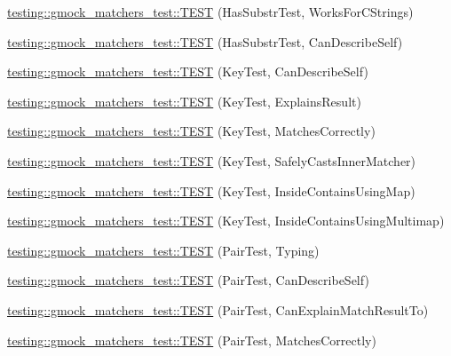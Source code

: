 \begin{DoxyCompactItemize}
\item 
\hyperlink{namespacetesting_1_1gmock__matchers__test_a147dde340ba8f77308cd116d3bb831d6}{testing\+::gmock\+\_\+matchers\+\_\+test\+::\+T\+E\+ST} (Has\+Substr\+Test, Works\+For\+C\+Strings)
\item 
\hyperlink{namespacetesting_1_1gmock__matchers__test_ae47e8ad8f8a4a33ac08b596eb839380e}{testing\+::gmock\+\_\+matchers\+\_\+test\+::\+T\+E\+ST} (Has\+Substr\+Test, Can\+Describe\+Self)
\item 
\hyperlink{namespacetesting_1_1gmock__matchers__test_acdbdca45a537261fd168cdb8df9348d7}{testing\+::gmock\+\_\+matchers\+\_\+test\+::\+T\+E\+ST} (Key\+Test, Can\+Describe\+Self)
\item 
\hyperlink{namespacetesting_1_1gmock__matchers__test_a38169c972e14fef59a41e532fb5b431e}{testing\+::gmock\+\_\+matchers\+\_\+test\+::\+T\+E\+ST} (Key\+Test, Explains\+Result)
\item 
\hyperlink{namespacetesting_1_1gmock__matchers__test_a39f4f76617c414ab715b701eb82eeee4}{testing\+::gmock\+\_\+matchers\+\_\+test\+::\+T\+E\+ST} (Key\+Test, Matches\+Correctly)
\item 
\hyperlink{namespacetesting_1_1gmock__matchers__test_a6b05d274d57a4aa120bb497c34ce3a68}{testing\+::gmock\+\_\+matchers\+\_\+test\+::\+T\+E\+ST} (Key\+Test, Safely\+Casts\+Inner\+Matcher)
\item 
\hyperlink{namespacetesting_1_1gmock__matchers__test_af9f4e295413489a7e3acafc59584c3c4}{testing\+::gmock\+\_\+matchers\+\_\+test\+::\+T\+E\+ST} (Key\+Test, Inside\+Contains\+Using\+Map)
\item 
\hyperlink{namespacetesting_1_1gmock__matchers__test_af90ca00690094484af6c34eadf4dd7c3}{testing\+::gmock\+\_\+matchers\+\_\+test\+::\+T\+E\+ST} (Key\+Test, Inside\+Contains\+Using\+Multimap)
\item 
\hyperlink{namespacetesting_1_1gmock__matchers__test_a5689064ea3fe50424dd1ea036d107aa8}{testing\+::gmock\+\_\+matchers\+\_\+test\+::\+T\+E\+ST} (Pair\+Test, Typing)
\item 
\hyperlink{namespacetesting_1_1gmock__matchers__test_a672ba279448f634fae495ed7dc9260bd}{testing\+::gmock\+\_\+matchers\+\_\+test\+::\+T\+E\+ST} (Pair\+Test, Can\+Describe\+Self)
\item 
\hyperlink{namespacetesting_1_1gmock__matchers__test_a4ee8f3967e3658cd7bd340558922f131}{testing\+::gmock\+\_\+matchers\+\_\+test\+::\+T\+E\+ST} (Pair\+Test, Can\+Explain\+Match\+Result\+To)
\item 
\hyperlink{namespacetesting_1_1gmock__matchers__test_acdb02e9ac603c91b35602751f6a81239}{testing\+::gmock\+\_\+matchers\+\_\+test\+::\+T\+E\+ST} (Pair\+Test, Matches\+Correctly)

\end{DoxyCompactItemize}
